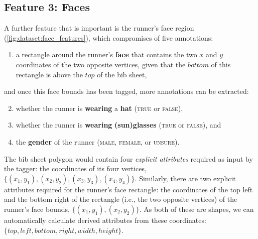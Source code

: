 \subsection{Feature 3: Faces}

A further feature that is important is the runner's face region (\cref{fig:dataset:face_features}), which compromises of five annotations:

\begin{enumerate}
  \item a rectangle around the runner's \textbf{face} that contains the two $x$ and $y$ coordinates of the two opposite vertices, given that the $bottom$ of this rectangle is above the $top$ of the bib sheet,
\end{enumerate}

\noindent
and once this face bounds has been tagged, more annotations can be extracted:

\begin{enumerate}
  \setcounter{enumi}{1}
  \item whether the runner is \textbf{wearing} a \textbf{hat} (\textsc{true} or \textsc{false}),
  \item whether the runner is \textbf{wearing} \textbf{(sun)glasses} (\textsc{true} or \textsc{false}), and
  \item the \textbf{gender} of the runner (\textsc{male}, \textsc{female}, or \textsc{unsure}).
\end{enumerate}

The bib sheet polygon would contain four \textit{explicit attributes} required as input by the tagger: the coordinates of its four vertices, $\{ (x_{1}, y_{1}), (x_{2}, y_{2}), (x_{3}, y_{3}), (x_{4}, y_{4}) \}$. Similarly, there are two explicit attributes required for the runner's face rectangle: the coordinates of the top left and the bottom right of the rectangle (i.e., the two opposite vertices) of the runner's face bounds, $\{ (x_{1}, y_{1}), (x_{2}, y_{2}) \}$. As both of these are shapes, we can automatically calculate derived attributes from these coordinates:  $\{ top, left, bottom, right, width, height \}$.

